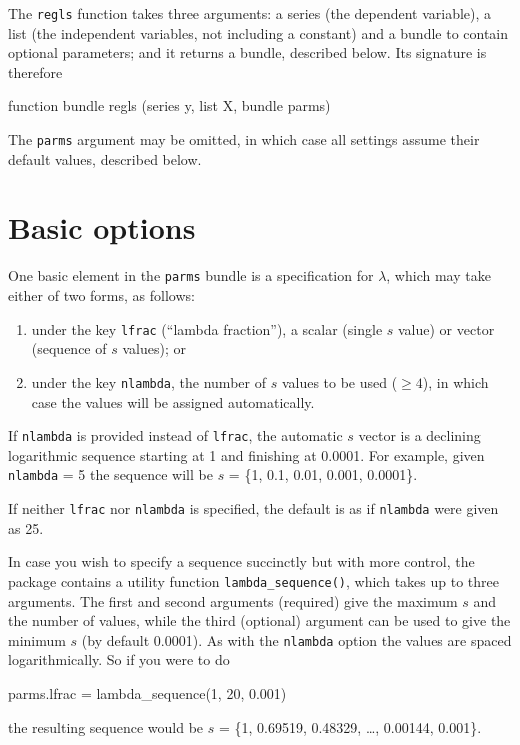 \documentclass{article}
\begin{document}
The \texttt{regls} function takes three arguments: a series (the
dependent variable), a list (the independent variables, not including
a constant) and a bundle to contain optional parameters; and it
returns a bundle, described below. Its signature is therefore
\begin{code}
function bundle regls (series y, list X, bundle parms)
\end{code}

The \texttt{parms} argument may be omitted, in which case all settings
assume their default values, described below.

\section{Basic options}
\label{sec:basic-opts}

One basic element in the \texttt{parms} bundle is a specification for
$\lambda$, which may take either of two forms, as follows:
\begin{enumerate}
\item under the key \texttt{lfrac} (``lambda fraction''), a scalar
  (single $s$ value) or vector (sequence of $s$ values); or
\item under the key \texttt{nlambda}, the number of $s$ values to be
  used ($\geq 4$), in which case the values will be assigned
  automatically.
\end{enumerate}
If \texttt{nlambda} is provided instead of \texttt{lfrac}, the
automatic $s$ vector is a declining logarithmic sequence starting at 1
and finishing at 0.0001. For example, given \texttt{nlambda} = 5 the
sequence will be $s$ = \{1, 0.1, 0.01, 0.001, 0.0001\}.

If neither \texttt{lfrac} nor \texttt{nlambda} is specified, the
default is as if \texttt{nlambda} were given as 25.

In case you wish to specify a sequence succinctly but with more
control, the package contains a utility function
\texttt{lambda\_sequence()}, which takes up to three arguments. The
first and second arguments (required) give the maximum $s$ and the
number of values, while the third (optional) argument can be used to
give the minimum $s$ (by default 0.0001). As with the \texttt{nlambda}
option the values are spaced logarithmically.  So if you were to do
\begin{code}
parms.lfrac = lambda_sequence(1, 20, 0.001)
\end{code}
the resulting sequence would be $s$ = \{1, 0.69519, 0.48329, \dots,
0.00144, 0.001\}.
\end{document}
